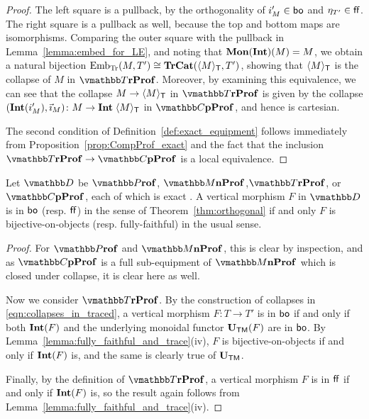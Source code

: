 \documentclass[11pt,oneside,article]{memoir}
\begin{document}
\begin{proof}
   The left square is a pullback, by the orthogonality of $i'_M\in\mathsf{bo}$ and $\eta_{T'}\in\mathsf{ff}$. The
   right square is a pullback as well, because the top and bottom maps are isomorphisms. Comparing the outer
   square with the pullback in Lemma~\ref{lemma:embed_for_LE}, and noting that $\mathbf{Mon}(\mathbf{Int})(M)=M$, we
   obtain a natural bijection $\mathrm{Emb}_{\mathrm{Tr}}(M,T')\cong\mathbf{TrCat}(\langle M\rangle_{\mathsf{T}},T')$,
   showing that $\langle M\rangle_{\mathsf{T}}$ is the collapse of $M$ in $\dTrProf$. Moreover, by examining
   this equivalence, we can see that the collapse $M\to \langle M\rangle_{\mathsf{T}}$ in $\dTrProf$ is
   given by the collapse $(\mathbf{Int}(i'_M),\vec{\imath}_M)\colon M\to\mathbf{Int}\;\langle M\rangle_{\mathsf{T}}$ in
   $\dCompProf$, and hence is cartesian.

   The second condition of Definition~\ref{def:exact_equipment} follows immediately from
   Proposition~\ref{prop:CompProf_exact} and the fact that the inclusion $\dTrProf\to\dCompProf$ is
   a local equivalence.
\end{proof}

\begin{proposition}\label{prop:boff_well_named}
   Let $\dcat{D}$ be $\dProf$, $\dMonProf$,$\dTrProf$, or $\dCompProf$, each of which is exact  . A vertical morphism
   $F$ in $\dcat{D}$ is in $\mathsf{bo}$ (resp. $\mathsf{ff}$) in the sense of Theorem~\ref{thm:orthogonal} if and only
   $F$ is bijective-on-objects (resp. fully-faithful) in the usual sense.
\end{proposition}
\begin{proof}
   For $\dProf$ and $\dMonProf$, this is clear by inspection, and as $\dCompProf$ is a full sub-equipment of
   $\dMonProf$ which is closed under collapse, it is clear here as well.

   Now we consider $\dTrProf$. By the construction of collapses in
   \eqref{eqn:collapses_in_traced},  a vertical morphism $F\colon T\to T'$ is in $\mathsf{bo}$ if and
   only if both $\mathbf{Int}(F)$ and the underlying monoidal functor $\mathbf{U}_{\mathsf{TM}}(F)$ are in $\mathsf{bo}$. By
   Lemma~\ref{lemma:fully_faithful_and_trace}(iv), $F$ is bijective-on-objects if and only if $\mathbf{Int}(F)$
   is, and the same is clearly true of $\mathbf{U}_{\mathsf{TM}}$.

   Finally, by the definition of $\dTrProf$, a vertical morphism $F$ is in $\mathsf{ff}$ if and only if
   $\mathbf{Int}(F)$ is, so the result again follows from Lemma~\ref{lemma:fully_faithful_and_trace}(iv).
\end{proof}
\end{document}
